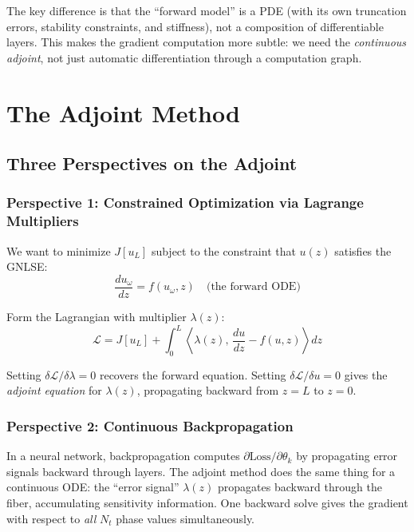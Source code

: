 \documentclass[12pt,a4paper]{article}
\newcommand{\dv}[2]{\frac{d #1}{d #2}}
\theoremstyle{definition}
\begin{document}
The key difference is that the ``forward model'' is a PDE (with its own truncation errors, stability constraints, and stiffness), not a composition of differentiable layers. This makes the gradient computation more subtle: we need the \emph{continuous adjoint}, not just automatic differentiation through a computation graph.


\section{The Adjoint Method}
\label{sec:adjoint}

\subsection{Three Perspectives on the Adjoint}

\subsubsection{Perspective 1: Constrained Optimization via Lagrange Multipliers}

We want to minimize $J[u_L]$ subject to the constraint that $u(z)$ satisfies the GNLSE:
\begin{equation}
\dv{u_\omega}{z} = f(u_\omega, z) \quad \text{(the forward ODE)}
\end{equation}

Form the Lagrangian with multiplier $\lambda(z)$:
\begin{equation}
\mathcal{L} = J[u_L] + \int_0^L \left\langle \lambda(z),\, \dv{u}{z} - f(u,z) \right\rangle dz
\label{eq:lagrangian}
\end{equation}

Setting $\delta\mathcal{L}/\delta\lambda = 0$ recovers the forward equation. Setting $\delta\mathcal{L}/\delta u = 0$ gives the \emph{adjoint equation} for $\lambda(z)$, propagating backward from $z=L$ to $z=0$.

\subsubsection{Perspective 2: Continuous Backpropagation}

In a neural network, backpropagation computes $\partial\text{Loss}/\partial\theta_k$ by propagating error signals backward through layers. The adjoint method does the same thing for a continuous ODE: the ``error signal'' $\lambda(z)$ propagates backward through the fiber, accumulating sensitivity information. One backward solve gives the gradient with respect to \emph{all} $N_t$ phase values simultaneously.
\end{document}
